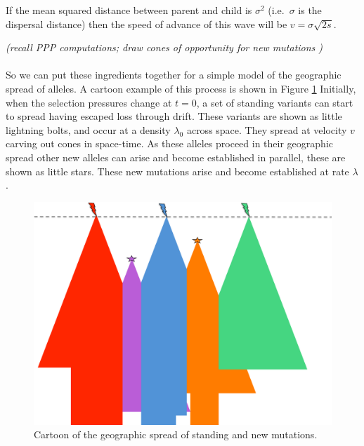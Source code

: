 \documentclass{article}
\newcommand{\plr}[1]{{\it\color{blue}(#1)}}
\begin{document}
If the mean squared distance between parent and child is $\sigma^2$
(i.e.\ $\sigma$ is the dispersal distance) then the speed of advance
of this wave will be $v = \sigma \sqrt{2s}$. 

\plr{recall PPP computations; draw cones of opportunity for new mutations }

\paragraph{}
So we can put these ingredients together for a simple model of the
geographic spread of alleles. A cartoon example of this process is
shown in Figure \ref{fig:cartoon} Initially, when the selection
pressures change at $t=0$, a set of standing variants can start to
spread having escaped loss through drift. These variants are shown as
little lightning bolts, and occur at a density $\lambda_0$ across
space. 
They spread at velocity $v$ carving out cones in space-time. As these
alleles proceed in their geographic spread other new alleles can arise
and become established in parallel, these are shown as little
stars. These new mutations arise and become established at rate $\lambda$.



\begin{figure}[ht]
  \begin{center}
    \includegraphics{spreading_alleles_trimmed}
  \end{center}
  \caption{
Cartoon of the geographic spread of standing and new mutations. 
}
  \label{fig:cartoon}
  
\end{figure}
\end{document}

